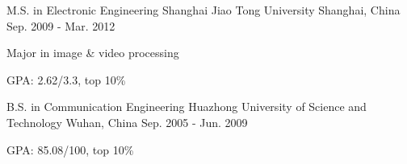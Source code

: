 

\begin{cventries}

  \cventry
    {M.S. in Electronic Engineering} %
    {Shanghai Jiao Tong University} %
    {Shanghai, China} %
    {Sep. 2009 - Mar. 2012} %
    {
      \begin{cvitems} %
        \item {Major in image \& video processing}
        \item {GPA: 2.62/3.3, top 10\%}
      \end{cvitems}
    }

  \cventry
    {B.S. in Communication Engineering} %
    {Huazhong University of Science and Technology} %
    {Wuhan, China} %
    {Sep. 2005 - Jun. 2009} %
    {
      \begin{cvitems} %
        \item {GPA: 85.08/100, top 10\%}
      \end{cvitems}
    }

\end{cventries}
